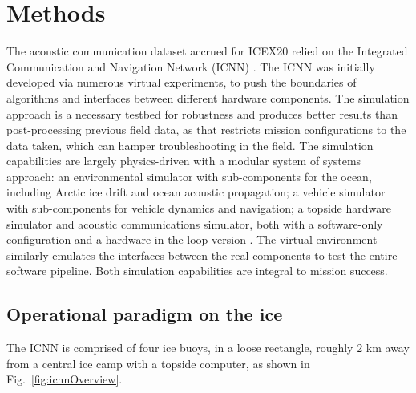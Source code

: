 \section{\label{sec:methods} Methods}

The acoustic communication dataset accrued for ICEX20 relied on the Integrated Communication and Navigation Network (ICNN) \citep{schneider_self-adapting_2020,randeni_construction_2020,randeni_high-resolution_2021}.
The ICNN was initially developed via numerous virtual experiments, to push the boundaries of algorithms and interfaces between different hardware components.
The simulation approach is a necessary testbed for robustness and produces better results than post-processing previous field data, as that restricts mission configurations to the data taken, which can hamper troubleshooting in the field.
The simulation capabilities are largely physics-driven with a modular system of systems approach: an environmental simulator with sub-components for the ocean, including Arctic ice drift and ocean acoustic propagation; a vehicle simulator with sub-components for vehicle dynamics and navigation; a topside hardware simulator and acoustic communications simulator, both with a software-only configuration and a hardware-in-the-loop version \citep{schneider_netsim_2018}.
The virtual environment similarly emulates the interfaces between the real components to test the entire software pipeline.
Both simulation capabilities are integral to mission success.

\subsection{Operational paradigm on the ice}

The ICNN is comprised of four ice buoys, in a loose rectangle, roughly 2 km away from a central ice camp with a topside computer, as shown in Fig.~\ref{fig:icnnOverview}.

